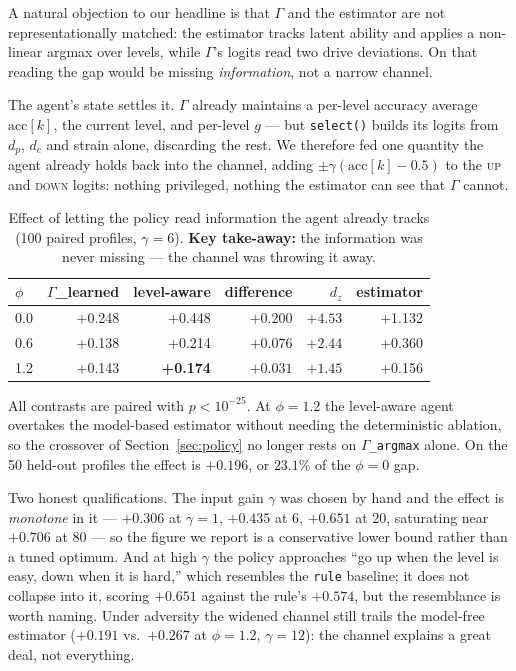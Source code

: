\documentclass{article}
\begin{document}
A natural objection to our headline is that $\Gamma$ and the estimator are not representationally matched: the estimator tracks latent ability and applies a non-linear argmax over levels, while $\Gamma$'s logits read two drive deviations. On that reading the gap would be missing \emph{information}, not a narrow channel.

The agent's state settles it. $\Gamma$ already maintains a per-level accuracy average $\text{acc}[k]$, the current level, and per-level $g$ --- but \texttt{select()} builds its logits from $d_p$, $d_c$ and strain alone, discarding the rest. We therefore fed one quantity the agent already holds back into the channel, adding $\pm\gamma(\text{acc}[k]-0.5)$ to the \textsc{up} and \textsc{down} logits: nothing privileged, nothing the estimator can see that $\Gamma$ cannot.

\begin{table}[H]
  \caption{Effect of letting the policy read information the agent already tracks (100 paired profiles, $\gamma{=}6$). \textbf{Key take-away:} the information was never missing --- the channel was throwing it away.}
  \centering\small
  \begin{tabular}{lrrrrr}
    \toprule
    $\phi$ & $\Gamma$\_learned & level-aware & difference & $d_z$ & estimator \\
    \midrule
    0.0 & +0.248 & +0.448 & $+0.200$ & $+4.53$ & +1.132 \\
    0.6 & +0.138 & +0.214 & $+0.076$ & $+2.44$ & +0.360 \\
    1.2 & +0.143 & \textbf{+0.174} & $+0.031$ & $+1.45$ & +0.156 \\
    \bottomrule
  \end{tabular}
\end{table}

All contrasts are paired with $p<10^{-25}$. At $\phi{=}1.2$ the level-aware agent overtakes the model-based estimator without needing the deterministic ablation, so the crossover of Section~\ref{sec:policy} no longer rests on \texttt{$\Gamma$\_argmax} alone. On the 50 held-out profiles the effect is $+0.196$, or $23.1\%$ of the $\phi{=}0$ gap.

Two honest qualifications. The input gain $\gamma$ was chosen by hand and the effect is \emph{monotone} in it --- $+0.306$ at $\gamma{=}1$, $+0.435$ at $6$, $+0.651$ at $20$, saturating near $+0.706$ at $80$ --- so the figure we report is a conservative lower bound rather than a tuned optimum. And at high $\gamma$ the policy approaches ``go up when the level is easy, down when it is hard,'' which resembles the \texttt{rule} baseline; it does not collapse into it, scoring $+0.651$ against the rule's $+0.574$, but the resemblance is worth naming. Under adversity the widened channel still trails the model-free estimator ($+0.191$ vs.\ $+0.267$ at $\phi{=}1.2$, $\gamma{=}12$): the channel explains a great deal, not everything.
\end{document}

